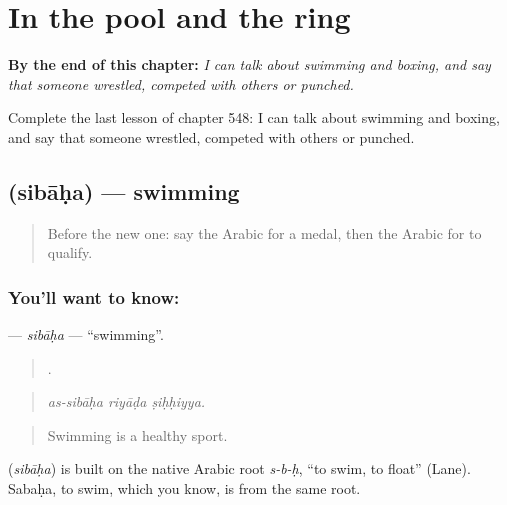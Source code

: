 
\chapter{In the pool and the ring}
\label{ch:ar-in-the-pool-and-the-ring}

\begin{chapteropening}
\textbf{By the end of this chapter:} \emph{I can talk about swimming and boxing, and say that someone wrestled, competed with others or punched.}

Complete the last lesson of chapter 548: I can talk about swimming and boxing, and say that someone wrestled, competed with others or punched.
\end{chapteropening}

\section[\texorpdfstring{\ar{سباحة} (sibāḥa)}{سباحة (sibāḥa)}]{ (sibāḥa) — swimming}

\label{lesson:AR-C548-sibaha}



\begin{quote}
Before the new one: say the Arabic for a medal, then the Arabic for to qualify.
\end{quote}

\subsection*{You'll want to know: }
\textbf{} — \emph{sibāḥa} — \textquotedblleft{}swimming\textquotedblright{}.

\begin{quote}
  .
\end{quote}

\begin{quote}
\emph{as-sibāḥa riyāḍa ṣiḥḥiyya.}
\end{quote}

\begin{quote}
Swimming is a healthy sport.
\end{quote}

\begin{cousinweb}
\textbf{} (\emph{sibāḥa}) is built on the native Arabic root \emph{s-b-ḥ}, \textquotedblleft{}to swim, to float\textquotedblright{} (Lane). Sabaḥa, to swim, which you know, is from the same root.
\end{cousinweb}

